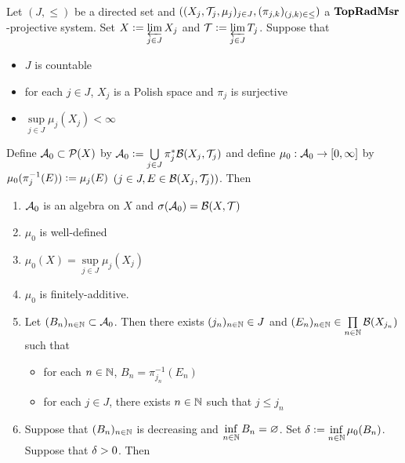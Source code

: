 \documentclass{book}
\begin{document}
	
	
	
	\begin{ex}   \\
		Let $(J, {\leq})$ be a directed set and $((X_j, \mathcal{T}_j, \mu_j)_{j \in J}, (\pi_{j,k})_{(j,k) \in {\leq}})$ a $\operatorname{\text{\textbf{TopRadMsr}}}$-projective system. Set $X \vcentcolon= \varprojlim\limits_{j \in J} X_j$ and $\mathcal{T} \vcentcolon= \varprojlim\limits_{j \in J} T_j$. Suppose that 
		\begin{itemize}
			\item $J$ is countable
			\item for each $j \in J$, $X_j$ is a Polish space and $\pi_j$ is surjective
			\item $\sup\limits_{j \in J} \mu_j(X_j) < \infty$ 
		\end{itemize}
		Define $\mathcal{A}_0 \subset \mathcal{P}(X)$ by $\mathcal{A}_0 \vcentcolon= \bigcup\limits_{j \in J} \pi_j^*\mathcal{B}(X_j, \mathcal{T}_j)$ and define $\mu_0: \mathcal{A}_0 \rightarrow [0,\infty]$ by $\mu_0(\pi_j^{-1}(E)) \vcentcolon= \mu_j(E)$ $(j \in J, E \in \mathcal{B}(X_j, \mathcal{T}_j))$. Then
		\begin{enumerate}
			\item $\mathcal{A}_0$ is an algebra on $X$ and $\sigma(\mathcal{A}_0) = \mathcal{B}(X, \mathcal{T})$
			\item $\mu_0$ is well-defined
			\item $\mu_0(X) = \sup\limits_{j \in J} \mu_j(X_j)$
			\item $\mu_0$ is finitely-additive.
			\item Let $(B_n)_{n \in \mathbb{N}} \subset \mathcal{A}_0$. Then there exists $(j_n)_{n \in \mathbb{N}} \in J$ and $(E_n)_{n \in \mathbb{N}} \in \prod\limits_{n \in \mathbb{N}} \mathcal{B}(X_{j_n})$ such that 
			\begin{itemize}
				\item for each $n \in \mathbb{N}$, $B_n = \pi_{j_n}^{-1}(E_n)$ 
				\item for each $j \in J$, there exists $n \in \mathbb{N}$ such that $j \leq j_n$
			\end{itemize}
			\item Suppose that $(B_n)_{n \in \mathbb{N}}$ is decreasing and $\inf\limits_{n \in \mathbb{N}} B_n = \varnothing$. Set $\delta \vcentcolon= \inf\limits_{n \in \mathbb{N}} \mu_0(B_n)$. Suppose that $\delta > 0$. Then 

\end{enumerate}
\end{ex}
\end{document}
